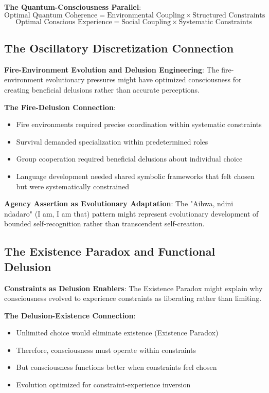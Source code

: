 \documentclass[12pt]{article}
\begin{document}
\textbf{The Quantum-Consciousness Parallel}:
$$\text{Optimal Quantum Coherence} = \text{Environmental Coupling} \times \text{Structured Constraints}$$
$$\text{Optimal Conscious Experience} = \text{Social Coupling} \times \text{Systematic Constraints}$$

\subsection{The Oscillatory Discretization Connection}

\textbf{Fire-Environment Evolution and Delusion Engineering}: The fire-environment evolutionary pressures might have optimized consciousness for creating beneficial delusions rather than accurate perceptions.

\textbf{The Fire-Delusion Connection}:
\begin{itemize}
\item Fire environments required precise coordination within systematic constraints
\item Survival demanded specialization within predetermined roles
\item Group cooperation required beneficial delusions about individual choice
\item Language development needed shared symbolic frameworks that felt chosen but were systematically constrained
\end{itemize}

\textbf{Agency Assertion as Evolutionary Adaptation}: The "Aihwa, ndini ndadaro" (I am, I am that) pattern might represent evolutionary development of bounded self-recognition rather than transcendent self-creation.

\subsection{The Existence Paradox and Functional Delusion}

\textbf{Constraints as Delusion Enablers}: The Existence Paradox might explain why consciousness evolved to experience constraints as liberating rather than limiting.

\textbf{The Delusion-Existence Connection}:
\begin{itemize}
\item Unlimited choice would eliminate existence (Existence Paradox)
\item Therefore, consciousness must operate within constraints
\item But consciousness functions better when constraints feel chosen
\item Evolution optimized for constraint-experience inversion
\end{itemize}
\end{document}
